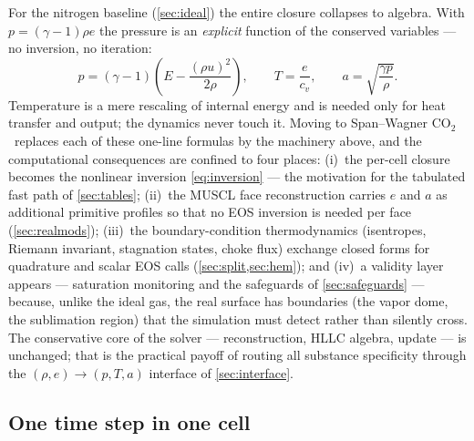 \documentclass[11pt]{article}
\newcommand{\co}{CO$_2$}
\begin{document}
For the nitrogen baseline (\cref{sec:ideal}) the entire closure
collapses to algebra. With $p = (\gamma - 1)\rho e$ the pressure is an
\emph{explicit} function of the conserved variables --- no inversion,
no iteration:
\begin{equation}
p = (\gamma - 1)\left(E - \frac{(\rho u)^2}{2\rho}\right),
\qquad
T = \frac{e}{c_v},
\qquad
a = \sqrt{\frac{\gamma p}{\rho}} .
\end{equation}
Temperature is a mere rescaling of internal energy and is needed only
for heat transfer and output; the dynamics never touch it. Moving to
Span--Wagner \co\ replaces each of these one-line formulas by the
machinery above, and the computational consequences are confined to
four places: (i)~the per-cell closure becomes the nonlinear inversion
\eqref{eq:inversion} --- the motivation for the tabulated fast path of
\cref{sec:tables}; (ii)~the MUSCL face reconstruction carries $e$ and
$a$ as additional primitive profiles so that no EOS inversion is
needed per face (\cref{sec:realmods}); (iii)~the boundary-condition
thermodynamics (isentropes, Riemann invariant, stagnation states,
choke flux) exchange closed forms for quadrature and scalar EOS calls
(\cref{sec:split,sec:hem}); and (iv)~a validity layer appears ---
saturation monitoring and the safeguards of \cref{sec:safeguards} ---
because, unlike the ideal gas, the real surface has boundaries (the
vapor dome, the sublimation region) that the simulation must detect
rather than silently cross. The conservative core of the solver ---
reconstruction, HLLC algebra, update --- is unchanged; that is the
practical payoff of routing all substance specificity through the
$(\rho, e) \to (p, T, a)$ interface of \cref{sec:interface}.

\subsection{One time step in one cell}
\label{app:step}
\end{document}
